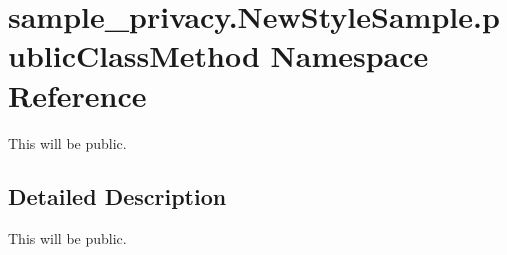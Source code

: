 \hypertarget{namespacesample__privacy_1_1_new_style_sample_1_1public_class_method}{\section{sample\-\_\-privacy.\-New\-Style\-Sample.\-public\-Class\-Method Namespace Reference}
\label{namespacesample__privacy_1_1_new_style_sample_1_1public_class_method}
}


This will be public.  




\subsection{Detailed Description}
This will be public. 
